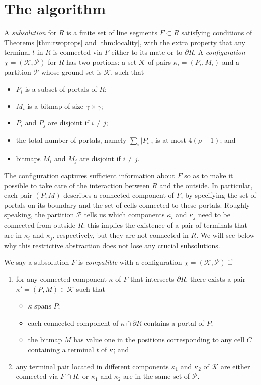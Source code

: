\documentclass[extras,11pt]{article} \usepackage{fullpage}
\theoremstyle{mytheorem}
\begin{document}
\section{The algorithm}\label{sec:algo}
A \emph{subsolution} for $R$ is a finite set of line segments $F \subset R$
satisfying conditions of Theorems \ref{thm:twoprops} and \ref{thm:locality},
with the extra property that any terminal $t$ in $R$ is connected via $F$ either to its mate or to $\partial R$.
A \emph{configuration} $\chi=(\mathcal{K}, \mathcal{P})$ for $R$ has two portions:
a set $\mathcal{K}$ of pairs $\kappa_i=(P_i,M_i)$ and a partition $\mathcal{P}$ whose ground set is $\mathcal{K}$, such that
\begin{itemize}
\item $P_i$ is a subset of portals of $R$;
\item $M_i$ is a bitmap of size $\gamma\times\gamma$;
\item $P_i$ and $P_j$ are disjoint if $i\neq j$;
\item the total number of portals, namely $\sum_i|P_i|$, is at most $4(\rho+1)$; and
\item bitmaps $M_i$ and $M_j$ are disjoint if $i\neq j$.
\end{itemize}
The configuration captures sufficient information about $F$ so as to make it possible to take care of the interaction between $R$ and the outside.
In particular, each pair $(P,M)$ describes a connected component of $F$, by specifying the set of portals on its boundary and the set of cells connected to these portals.
Roughly speaking, the partition $\mathcal{P}$ tells us which components $\kappa_i$ and $\kappa_j$ need to be connected from outside $R$:
 this implies the existence of a pair of terminals that are in $\kappa_i$ and $\kappa_j$, respectively, but they are not connected in $R$.
We will see below why this restrictive abstraction does not lose any crucial subsolutions.


We say a subsolution $F$ is \emph{compatible} with a  configuration $\chi=(\mathcal{K},\mathcal{P})$ if
\begin{enumerate}
\item
for any connected component $\kappa$ of $F$ that intersects $\partial R$,
 there exists a pair $\kappa'=(P,M)\in\mathcal{K}$ such that
\begin{itemize}
\item $\kappa$ spans $P$;
\item each connected component of $\kappa\cap\partial R$ contains a portal of $P$;
\item the bitmap $M$ has value one in the positions corresponding to any cell $C$ containing a terminal $t$ of $\kappa$; and
\end{itemize}
\vspace{-1mm}
\item
 any terminal pair located in different components $\kappa_1$ and $\kappa_2$ of $\mathcal{K}$ are either connected via $F\cap R$,
 or $\kappa_1$ and $\kappa_2$ are in the same set of $\mathcal{P}$.
\end{enumerate}
\end{document}
